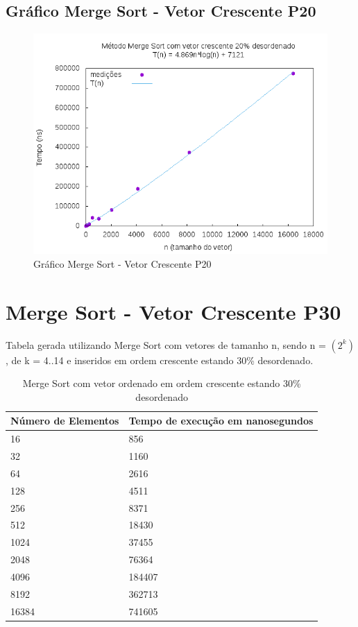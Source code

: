 \documentclass[12pt,a4paper,twoside]{report}
\begin{document}
\subsection{Gráfico Merge Sort - Vetor Crescente P20}
\begin{figure}[H]
    \centering
    \includegraphics[width=0.7\linewidth]{graficos/MergeSort/vIntCrescenteP20/vIntCrescenteP20.png}
  \caption{Gráfico Merge Sort - Vetor Crescente P20}
\end{figure}

\section{Merge Sort - Vetor Crescente P30}
Tabela gerada utilizando Merge Sort com vetores de tamanho n, sendo n = $(2^k)$, de k = 4..14 e inseridos em ordem crescente estando 30\% desordenado.
\begin{table}[H]
\centering
\caption{Merge Sort com vetor ordenado em ordem crescente estando 30\% desordenado}
\label{my-label}
\begin{tabular}{|l|l|}
\hline
\multicolumn{1}{|c|}{\textbf{Número de Elementos}} & \multicolumn{1}{c|}{\textbf{Tempo de execução em nanosegundos}} \\ \hline
16 & 856 \\ \hline
32 & 1160 \\ \hline
64 & 2616 \\ \hline
128 & 4511 \\ \hline
256 & 8371 \\ \hline
512 & 18430 \\ \hline
1024 & 37455 \\ \hline
2048 & 76364 \\ \hline
4096 & 184407 \\ \hline
8192 & 362713 \\ \hline
16384 & 741605 \\ \hline
\end{tabular}
\end{table}
\end{document}
